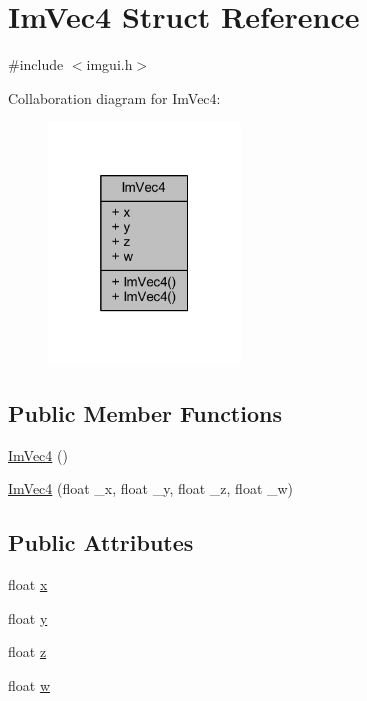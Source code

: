 \hypertarget{struct_im_vec4}{}\section{Im\+Vec4 Struct Reference}
\label{struct_im_vec4}


{\ttfamily \#include $<$imgui.\+h$>$}



Collaboration diagram for Im\+Vec4\+:
\nopagebreak
\begin{figure}[H]
\begin{center}
\leavevmode
\includegraphics[width=145pt]{struct_im_vec4__coll__graph}
\end{center}
\end{figure}
\subsection*{Public Member Functions}
\begin{DoxyCompactItemize}
\item 
\mbox{\hyperlink{struct_im_vec4_a6fba9919c960ca7eda33969d700d2a86}{Im\+Vec4}} ()
\item 
\mbox{\hyperlink{struct_im_vec4_af9e535f36b0fc7b9af0f60951fb4ffe4}{Im\+Vec4}} (float \+\_\+x, float \+\_\+y, float \+\_\+z, float \+\_\+w)
\end{DoxyCompactItemize}
\subsection*{Public Attributes}
\begin{DoxyCompactItemize}
\item 
float \mbox{\hyperlink{struct_im_vec4_a2090f651f5e5b78fedae8dab87343db6}{x}}
\item 
float \mbox{\hyperlink{struct_im_vec4_a6b4d00ae261be4fe54353c759c561fe7}{y}}
\item 
float \mbox{\hyperlink{struct_im_vec4_aba6a75356917a28c967954bb29133a1a}{z}}
\item 
float \mbox{\hyperlink{struct_im_vec4_afeed5acd9f0d2043175f4da229d12a38}{w}}
\end{DoxyCompactItemize}


